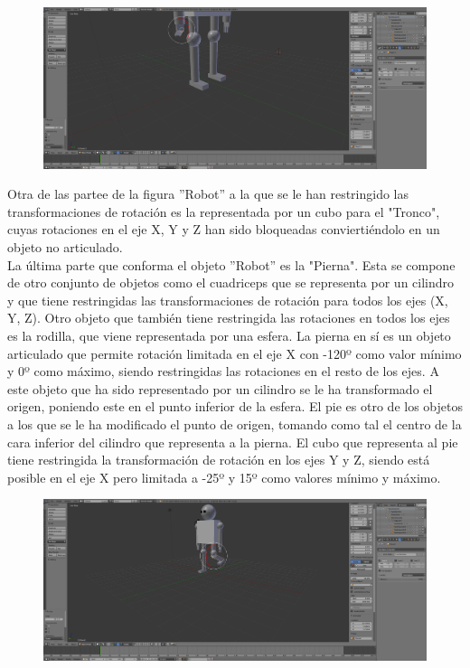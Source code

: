 \documentclass[10pt]{article}
\begin{document}
\begin{figure}[H]
	\begin{center}
	 		\includegraphics[width = 1.00\textwidth]{Imagenes/p2-img12.png}
	\end{center} 
\end{figure}

Otra de las partee de la figura ''Robot'' a la que se le han restringido las transformaciones de rotación es la representada por un cubo para el "Tronco", cuyas rotaciones en el eje X, Y y Z han sido bloqueadas conviertiéndolo en un objeto no articulado. \\

La última parte que conforma el objeto ''Robot'' es la "Pierna". Esta se compone de otro conjunto de objetos como el cuadriceps que se representa por un cilindro y que tiene restringidas las transformaciones de rotación para todos los ejes (X, Y, Z). Otro objeto que también tiene restringida las rotaciones en todos los ejes es la rodilla, que viene representada por una esfera. La pierna en sí es un objeto articulado que permite rotación limitada en el eje X con -120º como valor mínimo y 0º como máximo, siendo restringidas las rotaciones en el resto de los ejes. A este objeto que ha sido representado por un cilindro se le ha transformado el origen, poniendo este en el punto inferior de la esfera. El pie es otro de los objetos a los que se le ha modificado el punto de origen, tomando como tal el centro de la cara inferior del cilindro que representa a la pierna. El cubo que representa al pie tiene restringida la transformación de rotación en los ejes Y y Z, siendo está posible en el eje X pero limitada a -25º y 15º como valores mínimo y máximo. \\

\begin{figure}[H]
	\begin{center}
	 		\includegraphics[width = 1.00\textwidth]{Imagenes/p2-img13.png}
	\end{center} 
\end{figure}
\end{document}
